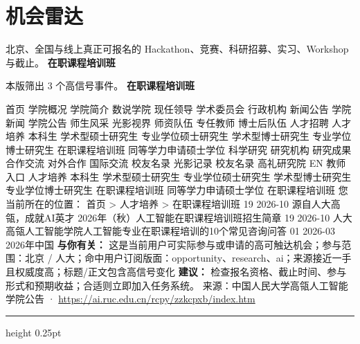 \documentclass[10.5pt]{ctexart}
\begin{document}
\section*{机会雷达}
{\color{ormuted} 北京、全国与线上真正可报名的 Hackathon、竞赛、科研招募、实习、Workshop 与截止。}
\vspace{2mm}
{\LARGE\bfseries 在职课程培训班}\par
\vspace{1mm}
{\color{ormuted} 本版筛出 3 个高信号事件。}
\vspace{3mm}
{\Large\bfseries 在职课程培训班}\par
首页 学院概况 学院简介 数说学院 现任领导 学术委员会 行政机构 新闻公告 学院新闻 学院公告 师生风采 光影视界 师资队伍 专任教师 博士后队伍 人才招聘 人才培养 本科生 学术型硕士研究生 专业学位硕士研究生 学术型博士研究生 专业学位博士研究生 在职课程培训班 同等学力申请硕士学位 科学研究 研究机构 研究成果 合作交流 对外合作 国际交流 校友名录 光影记录 校友名录 高礼研究院 EN 教师入口 人才培养 本科生 学术型硕士研究生 专业学位硕士研究生 学术型博士研究生 专业学位博士研究生 在职课程培训班 同等学力申请硕士学位 在职课程培训班 您当前所在的位置： 首页 > 人才培养 > 在职课程培训班 19 2026-10 源自人大高瓴，成就AI英才 2026年（秋）人工智能在职课程培训班招生简章 19 2026-10 人大高瓴人工智能学院人工智能专业在职课程培训的10个常见咨询问答 01 2026-03 2026年中国
\textbf{与你有关：} 这是当前用户可实际参与或申请的高可触达机会；参与范围：北京 / 人大；命中用户订阅版面：opportunity、research、ai；来源接近一手且权威度高；标题/正文包含高信号变化
\textbf{建议：} 检查报名资格、截止时间、参与形式和预期收益；合适则立即加入任务系统。
{\footnotesize\color{ormuted} 来源：中国人民大学高瓴人工智能学院公告 · \url{https://ai.ruc.edu.cn/rcpy/zzkcpxb/index.htm}}
\vspace{4mm}
\hrule height 0.25pt
\vspace{3mm}
\end{document}
